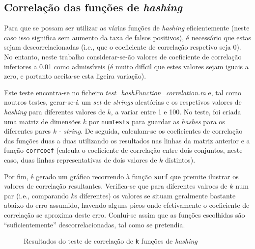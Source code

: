 \documentclass[a4paper,11pt,openright,oneside]{report}
\begin{document}
\subsection{Correlação das funções de \textit{hashing}}
\label{subsec.hashcorr}

Para que se possam ser utilizar as várias funções de \textit{hashing} eficientemente (neste caso isso significa sem aumento da taxa de falsos positivos), é necessário que estas sejam descorrelacionadas (i.e., que o coeficiente de correlação respetivo seja 0). No entanto, neste trabalho considerar-se-ão valores de coeficiente de correlação inferiores a 0.01 como admissíveis (é muito difícil que estes valores sejam iguais a zero, e portanto aceita-se esta ligeira variação).

Este teste encontra-se no ficheiro \textit{test\_hashFunction\_correlation.m} e, tal como noutros testes, gerar-se-á um \textit{set} de \textit{strings} aleatórias e os respetivos valores de \textit{hashing} para diferentes valores de $k$, a variar entre 1 e 100. No teste, foi criada uma matriz de dimensões $k$ por \texttt{numTests} para guardar as \textit{hashes} para os diferentes pares \textit{k - string}. De seguida, calculam-se os coeficientes de correlação das funções duas a duas utilizando os resultados nas linhas da matriz anterior e a função \texttt{corrcoef} (calcula o coeficiente de correlação entre dois conjuntos, neste caso, duas linhas representativas de dois valores de $k$ distintos).

Por fim, é gerado um gráfico recorrendo à função \texttt{surf} que premite ilustrar os valores de correlação resultantes. Verifica-se que para diferentes valroes de $k$ num par (i.e., comparando $k$s diferentes) os valores se situam geralmente bastante abaixo do erro assumido, havendo alguns picos onde efetivamente o coeficiente de correlação se aproxima deste erro. Conluí-se assim que as funções escolhidas são ``suficientemente'' descorrelacionadas, tal como se pretendia.

\begin{figure}[ht]	
\center
{}
\caption{Resultados do teste de correlação de \texttt{k} funções de \textit{hashing}}
\label{fig:hashcorr}
\end{figure}
\end{document}
